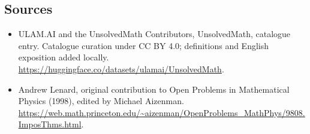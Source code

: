 \documentclass[11pt]{article}
\begin{document}
\subsection{Sources}
\begin{itemize}
\item[\hypertarget{source:statement:1}{S1}] ULAM.AI and the UnsolvedMath Contributors, UnsolvedMath, catalogue entry. Catalogue curation under CC BY 4.0; definitions and English exposition added locally.
\url{https://huggingface.co/datasets/ulamai/UnsolvedMath}.
\item[\hypertarget{source:statement:2}{S2}] Andrew Lenard, original contribution to Open Problems in Mathematical Physics (1998), edited by Michael Aizenman.
\url{https://web.math.princeton.edu/~aizenman/OpenProblems_MathPhys/9808.ImposThms.html}.
\end{itemize}
\label{end:statement}
\end{document}
